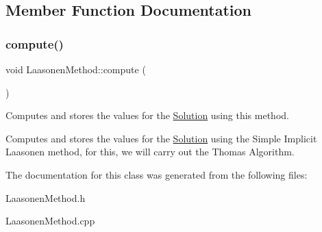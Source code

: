 \subsection{Member Function Documentation}
\mbox{\label{class_laasonen_method_ac5507d58a6c59f0ba9eaa3ca54a51f5d}} 
\subsubsection{\texorpdfstring{compute()}{compute()}}
{\footnotesize\ttfamily void Laasonen\+Method\+::compute (\begin{DoxyParamCaption}{ }\end{DoxyParamCaption})}

Computes and stores the values for the \hyperlink{class_solution}{Solution} using this method.

Computes and stores the values for the \hyperlink{class_solution}{Solution} using the Simple Implicit Laasonen method, for this, we will carry out the Thomas Algorithm. 

The documentation for this class was generated from the following files\+:\begin{DoxyCompactItemize}
\item 
Laasonen\+Method.\+h\item 
Laasonen\+Method.\+cpp\end{DoxyCompactItemize}
